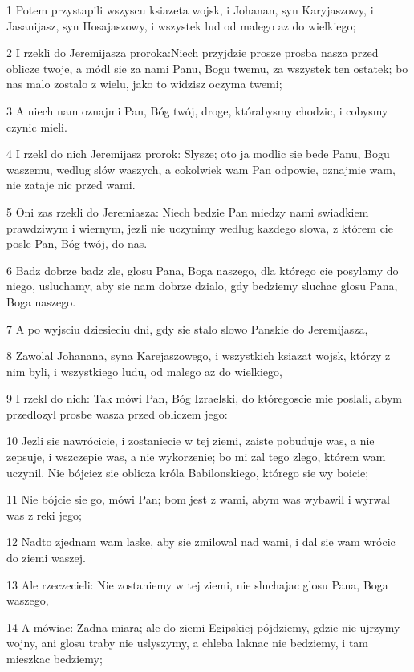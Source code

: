 \par 1 Potem przystapili wszyscu ksiazeta wojsk, i Johanan, syn Karyjaszowy, i Jasanijasz, syn Hosajaszowy, i wszystek lud od malego az do wielkiego;
\par 2 I rzekli do Jeremijasza proroka:Niech przyjdzie prosze prosba nasza przed oblicze twoje, a módl sie za nami Panu, Bogu twemu, za wszystek ten ostatek; bo nas malo zostalo z wielu, jako to widzisz oczyma twemi;
\par 3 A niech nam oznajmi Pan, Bóg twój, droge, którabysmy chodzic, i cobysmy czynic mieli.
\par 4 I rzekl do nich Jeremijasz prorok: Slysze; oto ja modlic sie bede Panu, Bogu waszemu, wedlug slów waszych, a cokolwiek wam Pan odpowie, oznajmie wam, nie zataje nic przed wami.
\par 5 Oni zas rzekli do Jeremiasza: Niech bedzie Pan miedzy nami swiadkiem prawdziwym i wiernym, jezli nie uczynimy wedlug kazdego slowa, z którem cie posle Pan, Bóg twój, do nas.
\par 6 Badz dobrze badz zle, glosu Pana, Boga naszego, dla którego cie posylamy do niego, usluchamy, aby sie nam dobrze dzialo, gdy bedziemy sluchac glosu Pana, Boga naszego.
\par 7 A po wyjsciu dziesieciu dni, gdy sie stalo slowo Panskie do Jeremijasza,
\par 8 Zawolal Johanana, syna Karejaszowego, i wszystkich ksiazat wojsk, którzy z nim byli, i wszystkiego ludu, od malego az do wielkiego,
\par 9 I rzekl do nich: Tak mówi Pan, Bóg Izraelski, do któregoscie mie poslali, abym przedlozyl prosbe wasza przed obliczem jego:
\par 10 Jezli sie nawrócicie, i zostaniecie w tej ziemi, zaiste pobuduje was, a nie zepsuje, i wszczepie was, a nie wykorzenie; bo mi zal tego zlego, którem wam uczynil. Nie bójciez sie oblicza króla Babilonskiego, którego sie wy boicie;
\par 11 Nie bójcie sie go, mówi Pan; bom jest z wami, abym was wybawil i wyrwal was z reki jego;
\par 12 Nadto zjednam wam laske, aby sie zmilowal nad wami, i dal sie wam wrócic do ziemi waszej.
\par 13 Ale rzeczecieli: Nie zostaniemy w tej ziemi, nie sluchajac glosu Pana, Boga waszego,
\par 14 A mówiac: Zadna miara; ale do ziemi Egipskiej pójdziemy, gdzie nie ujrzymy wojny, ani glosu traby nie uslyszymy, a chleba laknac nie bedziemy, i tam mieszkac bedziemy;
